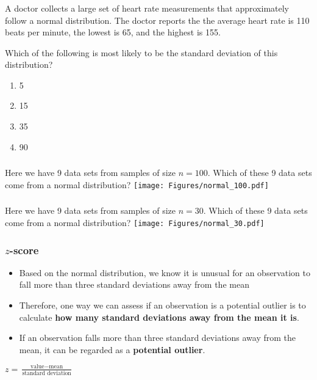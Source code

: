 \begin{frame}
\frametitle{\grp}
A doctor collects a large set of heart rate measurements that approximately follow a normal distribution.  The doctor reports the the average heart rate is 110 beats per minute, the lowest is 65, and the highest is 155.
\begin{clicker}{Which of the following is most likely to be the standard deviation of this distribution?}
\begin{enumerate}
    \item
    5
    \item
    15
    \item
    35
    \item
    90
\end{enumerate}
\end{clicker}
\end{frame}


\begin{frame}
\frametitle{\grp}
Here we have 9 data sets from samples of size $n=100$.  Which of these 9 data sets come from a normal distribution?
\texttt{[image: Figures/normal\_100.pdf]}
\end{frame}

\begin{frame}
\frametitle{\grp}
Here we have 9 data sets from samples of size $n=30$.  Which of these 9 data sets come from a normal distribution?
\texttt{[image: Figures/normal\_30.pdf]}
\end{frame}

\begin{frame}
\frametitle{$z$-score}
\begin{itemize}
    \item
    Based on the normal distribution, we know it is unusual for an observation to fall more than three standard deviations away from the mean
    \item
    Therefore, one way we can assess if an observation is a potential outlier is to calculate \textbf{how many standard deviations away from the mean it is}.
    \item
    If an observation falls more than three standard deviations away from the mean, it can be regarded as a \textbf{potential outlier}.
\end{itemize}
\begin{center}
$z=\frac{\mbox{value}-\mbox{mean}}{\mbox{standard deviation}}$
\end{center}
\end{frame}


